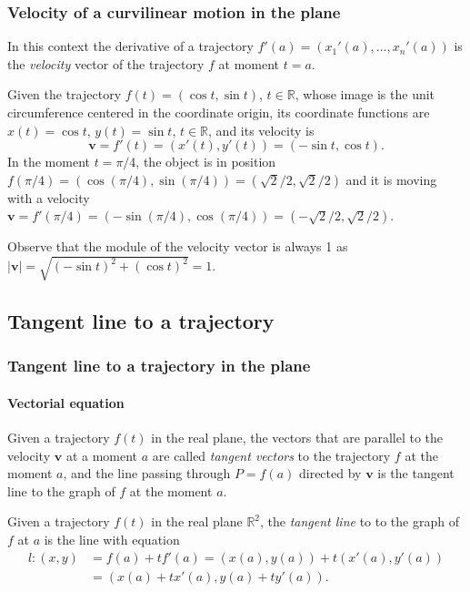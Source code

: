 \begin{frame}
\frametitle{Velocity of a curvilinear motion in the plane}
In this context the derivative of a trajectory $f'(a)=(x_1'(a),\ldots,x_n'(a))$ is the \emph{velocity} vector of the trajectory $f$ at moment $t=a$.

Given the trajectory $f(t) = (\cos t,\sin t)$, $t\in \mathbb{R}$, whose image is the unit circumference centered in the coordinate origin, its coordinate functions are $x(t) = \cos t$, $y(t) = \sin t$, $t\in \mathbb{R}$, and its velocity is
\[
\mathbf{v}=f'(t)=(x'(t),y'(t))=(-\sin t, \cos t).
\]
In the moment $t=\pi/4$, the object is in position $f(\pi/4) = (\cos(\pi/4),\sin(\pi/4)) =(\sqrt{2}/2,\sqrt{2}/2)$
and it is moving with a velocity $\mathbf{v}=f'(\pi/4)=(-\sin(\pi/4),\cos(\pi/4))=(-\sqrt{2}/2,\sqrt{2}/2)$.
\begin{center}
\end{center}
Observe that the module of the velocity vector is always 1 as
$|\mathbf{v}|=\sqrt{(-\sin t)^2+(\cos t)^2}=1$.
\end{frame}



\subsection{Tangent line to a trajectory}
\begin{frame}
\frametitle{Tangent line to a trajectory in the plane}
\framesubtitle{Vectorial equation}
Given a trajectory $f(t)$ in the real plane, the vectors that are parallel to the velocity $\mathbf{v}$ at a moment $a$ are called \emph{tangent vectors} to the trajectory $f$ at the moment $a$, and the line passing through $P=f(a)$ directed by $\mathbf{v}$ is the tangent line to the graph of $f$ at the moment $a$.

\begin{definition}
Given a trajectory $f(t)$ in the real plane $\mathbb{R}^2$, the \emph{tangent line} to to the graph of $f$ at $a$ is the line with equation
\begin{align*}
l:(x,y) &= f(a)+tf'(a) = (x(a),y(a))+t(x'(a),y'(a))\\
& = (x(a)+tx'(a),y(a)+ty'(a)).
\end{align*}
\end{definition}
\end{frame}


